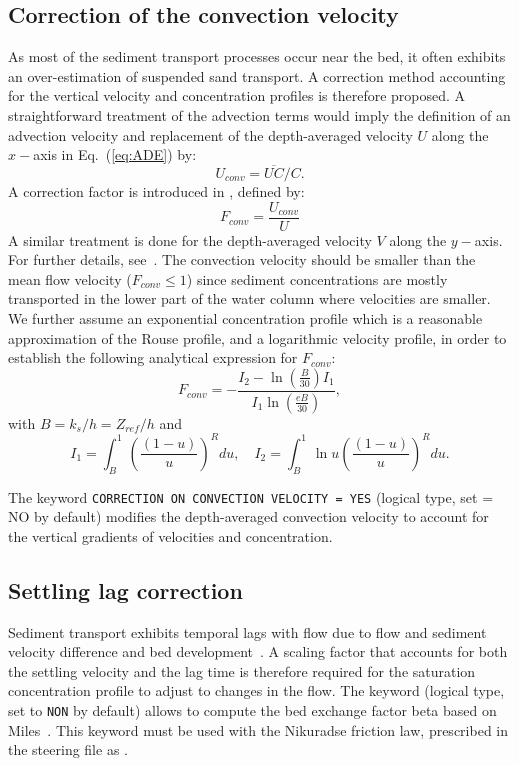 \subsection{Correction of the convection velocity}
As most of the sediment transport processes occur near the bed, it often exhibits an over-estimation of suspended sand transport.
A correction method accounting for the vertical velocity and concentration profiles is therefore proposed. A straightforward treatment of the advection terms would imply the
definition of an advection velocity and replacement of the depth-averaged
velocity $U$ along the $x-$axis in Eq.~(\ref{eq:ADE}) by:
\begin{equation*}
U_{conv} = \overline{UC}/C.
\end{equation*}
A correction factor is introduced in \gaia, defined by:
\begin{equation*}
F_{conv} =\frac{U_{conv}}{U}
\end{equation*}
A similar treatment is done for the depth-averaged velocity $V$ along the $y-$axis. For further details, see~\cite{Huybrechts}.
The convection velocity should be smaller than the mean flow velocity ($F_{conv} \leq 1$) since sediment concentrations are mostly transported in the lower part of the water column where velocities are smaller. We further
assume an exponential concentration profile which is a reasonable
approximation of the Rouse profile, and a logarithmic velocity profile, in
order to establish the following analytical expression for $F_{conv}$:
\begin{equation*}
F_{conv} =-\frac{I_2 - \ln\left(\frac{B}{30}\right) I_1}{I_1 \ln\left(
\frac{eB}{30}\right)},
\end{equation*}
with $B=k_s/h = Z_{ref}/h$ and
\begin{equation*}
I_1 =\int_B^1\left(\frac{(1-u)}{u}\right)^R du,\quad I_2 = \int_B^1 \ln u \left(\frac{(1-u)}{u} \right)^R du.
\end{equation*}

The keyword \texttt{CORRECTION ON CONVECTION VELOCITY = YES} (logical type, set {\ttfamily = NO} by default) modifies the depth-averaged convection velocity to account for the vertical gradients of velocities and concentration.

\subsection{Settling lag correction}
Sediment transport exhibits temporal lags with flow due to flow and sediment velocity difference and bed development~\cite{wu2007computational, Miles96}. A scaling factor that accounts for both the settling velocity and the lag time is therefore required for the saturation concentration profile to adjust to changes in the flow.
The keyword  (logical type, set to \texttt{NON} by default) allows to compute the bed exchange factor beta based on Miles~\cite{Miles96}. This keyword must be used with the Nikuradse friction law, prescribed in the  steering file as .



